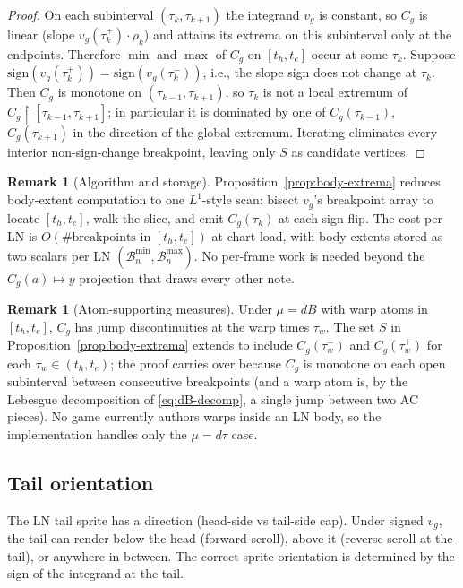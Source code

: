 \documentclass[11pt]{article}
\theoremstyle{definition}
\newtheorem{remark}[theorem]{Remark}
\newcommand{\Lone}{L^{1}}
\begin{document}
\begin{proof}
On each subinterval $(\tau_k, \tau_{k+1})$ the integrand $v_g$ is
constant, so $C_g$ is linear (slope $v_g(\tau_k^+) \cdot \rho_k$) and
attains its extrema on this subinterval only at the endpoints.
Therefore $\min$ and $\max$ of $C_g$ on $[t_h, t_e]$ occur at some
$\tau_k$. Suppose $\mathrm{sign}(v_g(\tau_k^+)) = \mathrm{sign}(v_g(\tau_k^-))$,
i.e., the slope sign does not change at $\tau_k$. Then $C_g$ is
monotone on $(\tau_{k-1}, \tau_{k+1})$, so $\tau_k$ is not a local
extremum of $C_g \restriction [\tau_{k-1}, \tau_{k+1}]$; in particular
it is dominated by one of $C_g(\tau_{k-1})$, $C_g(\tau_{k+1})$ in the
direction of the global extremum. Iterating eliminates every interior
non-sign-change breakpoint, leaving only $S$ as candidate vertices.
\qedhere
\end{proof}

\begin{remark}[Algorithm and storage]
Proposition~\ref{prop:body-extrema} reduces body-extent computation to
one $\Lone$-style scan: bisect $v_g$'s breakpoint array to locate
$[t_h, t_e]$, walk the slice, and emit $C_g(\tau_k)$ at each sign flip.
The cost per LN is $O(\#\text{breakpoints in } [t_h, t_e])$ at chart
load, with body extents stored as two scalars per LN
$(\mathcal{B}^{\min}_n, \mathcal{B}^{\max}_n)$. No per-frame work is
needed beyond the $C_g(a) \mapsto y$ projection that draws every other
note.
\end{remark}

\begin{remark}[Atom-supporting measures]
\label{rem:body-atoms}
Under $\mu = dB$ with warp atoms in $[t_h, t_e]$, $C_g$ has jump
discontinuities at the warp times $\tau_w$. The set $S$ in
Proposition~\ref{prop:body-extrema} extends to include
$C_g(\tau_w^-)$ and $C_g(\tau_w^+)$ for each $\tau_w \in (t_h, t_e)$;
the proof carries over because $C_g$ is monotone on each open
subinterval between consecutive breakpoints (and a warp atom is, by
the Lebesgue decomposition of \eqref{eq:dB-decomp}, a single jump
between two AC pieces). No game currently authors warps inside an LN
body, so the implementation handles only the $\mu = d\tau$ case.
\end{remark}

\subsection{Tail orientation}
\label{sec:tail-flip}

The LN tail sprite has a direction (head-side vs tail-side cap). Under
signed $v_g$, the tail can render below the head (forward scroll),
above it (reverse scroll at the tail), or anywhere in between. The
correct sprite orientation is determined by the sign of the integrand
at the tail.
\end{document}
